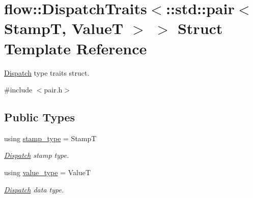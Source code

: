 \hypertarget{structflow_1_1_dispatch_traits_3_1_1std_1_1pair_3_01_stamp_t_00_01_value_t_01_4_01_4}{}\section{flow\+:\+:Dispatch\+Traits$<$\+:\+:std\+:\+:pair$<$ StampT, ValueT $>$ $>$ Struct Template Reference}
\label{structflow_1_1_dispatch_traits_3_1_1std_1_1pair_3_01_stamp_t_00_01_value_t_01_4_01_4}


\hyperlink{classflow_1_1_dispatch}{Dispatch} type traits struct.  




{\ttfamily \#include $<$pair.\+h$>$}

\subsection*{Public Types}
\begin{DoxyCompactItemize}
\item 
\mbox{\label{structflow_1_1_dispatch_traits_3_1_1std_1_1pair_3_01_stamp_t_00_01_value_t_01_4_01_4_a25994c07a836d387868ad588f3cd4a2b}} 
using \hyperlink{structflow_1_1_dispatch_traits_3_1_1std_1_1pair_3_01_stamp_t_00_01_value_t_01_4_01_4_a25994c07a836d387868ad588f3cd4a2b}{stamp\+\_\+type} = StampT
\begin{DoxyCompactList}\small\item\em \hyperlink{classflow_1_1_dispatch}{Dispatch} stamp type. \end{DoxyCompactList}\item 
\mbox{\label{structflow_1_1_dispatch_traits_3_1_1std_1_1pair_3_01_stamp_t_00_01_value_t_01_4_01_4_a5ea5077b6832edc338dc670bc7742528}} 
using \hyperlink{structflow_1_1_dispatch_traits_3_1_1std_1_1pair_3_01_stamp_t_00_01_value_t_01_4_01_4_a5ea5077b6832edc338dc670bc7742528}{value\+\_\+type} = ValueT
\begin{DoxyCompactList}\small\item\em \hyperlink{classflow_1_1_dispatch}{Dispatch} data type. \end{DoxyCompactList}\end{DoxyCompactItemize}


